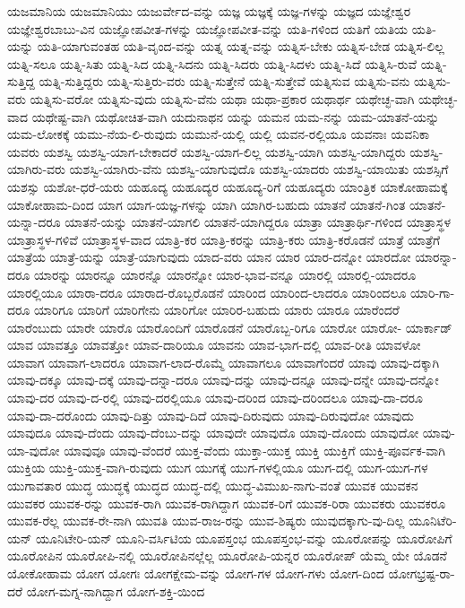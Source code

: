 {ಯಜಮಾನಿಯ
ಯಜಮಾನಿಯು
ಯಜುರ್ವೇದ-ವನ್ನು
ಯಜ್ಞ
ಯಜ್ಞಕ್ಕೆ
ಯಜ್ಞ-ಗಳನ್ನು
ಯಜ್ಞದ
ಯಜ್ಞೇಶ್ವರ
ಯಜ್ಞೇಶ್ವರಬಾಬು-ವಿನ
ಯಜ್ಞೋಪವೀತ-ಗಳನ್ನು
ಯಜ್ಞೋಪವೀತ-ವನ್ನು
ಯತಿ-ಗಳಿಂದ
ಯತಿಗೆ
ಯತಿಯ
ಯತಿ-ಯನ್ನು
ಯತಿ-ಯಾಗುವಂತಹ
ಯತಿ-ವೃಂದ-ವನ್ನು
ಯತ್ನ
ಯತ್ನ-ವನ್ನು
ಯತ್ನಿಸ-ಬೇಕು
ಯತ್ನಿಸ-ಬೇಡ
ಯತ್ನಿಸ-ಲಿಲ್ಲ
ಯತ್ನಿ-ಸಲೂ
ಯತ್ನಿ-ಸಿತು
ಯತ್ನಿ-ಸಿದ
ಯತ್ನಿ-ಸಿದನು
ಯತ್ನಿ-ಸಿದರು
ಯತ್ನಿ-ಸಿದಳು
ಯತ್ನಿ-ಸಿದೆ
ಯತ್ನಿಸಿ-ರುವೆ
ಯತ್ನಿ-ಸುತ್ತಿದ್ದ
ಯತ್ನಿ-ಸುತ್ತಿದ್ದರು
ಯತ್ನಿ-ಸುತ್ತಿರು-ವರು
ಯತ್ನಿ-ಸುತ್ತೇನೆ
ಯತ್ನಿ-ಸುತ್ತೇವೆ
ಯತ್ನಿಸುವ
ಯತ್ನಿಸು-ವನು
ಯತ್ನಿಸು-ವರು
ಯತ್ನಿಸು-ವರೋ
ಯತ್ನಿಸು-ವುದು
ಯತ್ನಿಸು-ವೆನು
ಯಥಾ
ಯಥಾ-ಪ್ರಕಾರ
ಯಥಾರ್ಥ
ಯಥೇಚ್ಛ-ವಾಗಿ
ಯಥೇಚ್ಛ-ವಾದ
ಯಥೇಷ್ಟ-ವಾಗಿ
ಯಥೋಚಿತ-ವಾಗಿ
ಯದುನಾಥನ
ಯನ್ನು
ಯಮನ
ಯಮ-ನನ್ನು
ಯಮ-ಯಾತನೆ-ಯನ್ನು
ಯಮ-ಲೋಕಕ್ಕೆ
ಯಮು-ನೆಯ-ಲಿ-ರುವುದು
ಯಮುನೆ-ಯಲ್ಲಿ
ಯಲ್ಲಿ
ಯವನ-ರಲ್ಲಿಯೂ
ಯವನಾಃ
ಯವನಿಕಾ
ಯವರು
ಯಶಸ್ವಿ
ಯಶಸ್ವಿ-ಯಾಗ-ಬೇಕಾದರೆ
ಯಶಸ್ವಿ-ಯಾಗ-ಲಿಲ್ಲ
ಯಶಸ್ವಿ-ಯಾಗಿ
ಯಶಸ್ವಿ-ಯಾಗಿದ್ದರು
ಯಶಸ್ವಿ-ಯಾಗಿರು-ವರು
ಯಶಸ್ವಿ-ಯಾಗಿರು-ವೆನು
ಯಶಸ್ವಿ-ಯಾಗುವುದೊ
ಯಶಸ್ವಿ-ಯಾದರು
ಯಶಸ್ವಿ-ಯಾಯಿತು
ಯಶಸ್ಸಿಗೆ
ಯಶಸ್ಸು
ಯಶೋ-ಧರೆ-ಯರು
ಯಹೂದ್ಯ
ಯಹೂದ್ಯರ
ಯಹೂದ್ಯ-ರಿಗೆ
ಯಹೂದ್ಯರು
ಯಾಂತ್ರಿಕ
ಯಾಕೋಹಾಮಕ್ಕೆ
ಯಾಕೋಹಾಮ-ದಿಂದ
ಯಾಗ
ಯಾಗ-ಯಜ್ಞ-ಗಳನ್ನು
ಯಾಗಿ
ಯಾಗಿರ-ಬಹುದು
ಯಾತನೆ
ಯಾತನೆ-ಗಿಂತ
ಯಾತನೆ-ಯನ್ನಾ-ದರೂ
ಯಾತನೆ-ಯನ್ನು
ಯಾತನೆ-ಯಾಗಲಿ
ಯಾತನೆ-ಯಾಗಿದ್ದರೂ
ಯಾತ್ರಾ
ಯಾತ್ರಾರ್ಥಿ-ಗಳಿಂದ
ಯಾತ್ರಾಸ್ಥಳ
ಯಾತ್ರಾಸ್ಥಳ-ಗಳಿವೆ
ಯಾತ್ರಾಸ್ಥಳ-ವಾದ
ಯಾತ್ರಿ-ಕರ
ಯಾತ್ರಿ-ಕರನ್ನು
ಯಾತ್ರಿ-ಕರು
ಯಾತ್ರಿ-ಕರೊಡನೆ
ಯಾತ್ರೆ
ಯಾತ್ರೆಗೆ
ಯಾತ್ರೆಯ
ಯಾತ್ರೆ-ಯನ್ನು
ಯಾತ್ರೆ-ಯಾಗುವುದು
ಯಾದ-ವರು
ಯಾನ
ಯಾರ
ಯಾರ-ದನ್ನೋ
ಯಾರದೋ
ಯಾರನ್ನಾ-ದರೂ
ಯಾರನ್ನು
ಯಾರನ್ನೂ
ಯಾರನ್ನೊ
ಯಾರನ್ನೋ
ಯಾರ-ಭಾವ-ವನ್ನೂ
ಯಾರಲ್ಲಿ
ಯಾರಲ್ಲಿ-ಯಾದರೂ
ಯಾರಲ್ಲಿಯೂ
ಯಾರಾ-ದರೂ
ಯಾರಾದ-ರೊಬ್ಬರೊಡನೆ
ಯಾರಿಂದ
ಯಾರಿಂದ-ಲಾದರೂ
ಯಾರಿಂದಲೂ
ಯಾರಿ-ಗಾ-ದರೂ
ಯಾರಿಗೂ
ಯಾರಿಗೆ
ಯಾರಿಗೇನು
ಯಾರಿಗೋ
ಯಾರಿರ-ಬಹುದು
ಯಾರು
ಯಾರೂ
ಯಾರೆಂದರೆ
ಯಾರೆಂಬುದು
ಯಾರೇ
ಯಾರೊ
ಯಾರೊಂದಿಗೆ
ಯಾರೊಡನೆ
ಯಾರೊಬ್ಬ-ರಿಗೂ
ಯಾರೋ
ಯಾರೋ-
ಯಾರ್ಕಾಡ್
ಯಾವ
ಯಾವತ್ತೂ
ಯಾವತ್ತೋ
ಯಾವ-ದಾರಿಯೂ
ಯಾವನು
ಯಾವ-ಭಾಗ-ದಲ್ಲಿ
ಯಾವ-ರೀತಿ
ಯಾವಳೋ
ಯಾವಾಗ
ಯಾವಾಗ-ಲಾದರೂ
ಯಾವಾಗ-ಲಾದ-ರೊಮ್ಮೆ
ಯಾವಾಗಲೂ
ಯಾವಾಗೆಂದರೆ
ಯಾವು
ಯಾವು-ದಕ್ಕಾಗಿ
ಯಾವು-ದಕ್ಕೂ
ಯಾವು-ದಕ್ಕೆ
ಯಾವು-ದನ್ನಾ-ದರೂ
ಯಾವು-ದನ್ನು
ಯಾವು-ದನ್ನೂ
ಯಾವು-ದನ್ನೇ
ಯಾವು-ದನ್ನೋ
ಯಾವು-ದರ
ಯಾವು-ದ-ರಲ್ಲಿ
ಯಾವು-ದರಲ್ಲಿಯೂ
ಯಾವು-ದರಿಂದ
ಯಾವು-ದರಿಂದಲೂ
ಯಾವು-ದಾ-ದರೂ
ಯಾವು-ದಾ-ದರೊಂದು
ಯಾವು-ದಿತ್ತು
ಯಾವು-ದಿದೆ
ಯಾವು-ದಿರುವುದು
ಯಾವು-ದಿರುವುದೋ
ಯಾವುದು
ಯಾವುದೂ
ಯಾವು-ದೆಂದು
ಯಾವು-ದೆಂಬು-ದನ್ನು
ಯಾವುದೇ
ಯಾವುದೊ
ಯಾವು-ದೊಂದು
ಯಾವುದೋ
ಯಾವು-ಯಾ-ವುದೋ
ಯಾವುವೂ
ಯಾವು-ವೆಂದರೆ
ಯುಕ್ತ-ವೆಂದು
ಯುಕ್ತಾ-ಯುಕ್ತ
ಯುಕ್ತಿ
ಯುಕ್ತಿಗೆ
ಯುಕ್ತಿ-ಪೂರ್ವಕ-ವಾಗಿ
ಯುಕ್ತಿಯ
ಯುಕ್ತಿ-ಯುಕ್ತ-ವಾಗಿ-ರುವುದು
ಯುಗ
ಯುಗಕ್ಕೆ
ಯುಗ-ಗಳಲ್ಲಿಯೂ
ಯುಗ-ದಲ್ಲಿ
ಯುಗ-ಯುಗ-ಗಳ
ಯುಗಾವತಾರ
ಯುದ್ಧ
ಯುದ್ಧಕ್ಕೆ
ಯುದ್ಧದ
ಯುದ್ಧ-ದಲ್ಲಿ
ಯುದ್ಧ-ವಿಮುಖ-ನಾಗು-ವಂತೆ
ಯುವಕ
ಯುವಕನ
ಯುವಕರ
ಯುವಕ-ರನ್ನು
ಯುವಕ-ರಾಗಿ
ಯುವಕ-ರಾಗಿದ್ದಾಗ
ಯುವಕ-ರಿಗೆ
ಯುವಕ-ರಿರಾ
ಯುವಕರು
ಯುವಕರೂ
ಯುವಕ-ರೆಲ್ಲ
ಯುವಕ-ರೇ-ನಾಗಿ
ಯುವತಿ
ಯುವ-ರಾಜ-ರನ್ನು
ಯುವ-ಶಿಷ್ಯರು
ಯುವುದಕ್ಕಾಗು-ವು-ದಿಲ್ಲ
ಯೂನಿಟೆರಿ-ಯನ್
ಯೂನಿಟೇರಿ-ಯನ್
ಯೂನಿ-ವರ್ಸಿಟಿಯ
ಯೂಪಸ್ತಂಭ
ಯೂಪಸ್ತಂಭ-ವನ್ನು
ಯೂರೋಪನ್ನು
ಯೂರೋಪಿಗೆ
ಯೂರೋಪಿನ
ಯೂರೋಪಿ-ನಲ್ಲಿ
ಯೂರೋಪಿನಲ್ಲೆಲ್ಲ
ಯೂರೋಪಿ-ಯನ್ನರ
ಯೂರೋಪ್
ಯೆಮ್ಮ
ಯೇ
ಯೊಡನೆ
ಯೋಕೋಹಾಮ
ಯೋಗ
ಯೋಗಃ
ಯೋಗಕ್ಷೇಮ-ವನ್ನು
ಯೋಗ-ಗಳ
ಯೋಗ-ಗಳು
ಯೋಗ-ದಿಂದ
ಯೋಗಭ್ರಷ್ಟ-ರಾ-ದರೆ
ಯೋಗ-ಮಗ್ನ-ನಾಗಿದ್ದಾಗ
ಯೋಗ-ಶಕ್ತಿ-ಯಿಂದ
}
